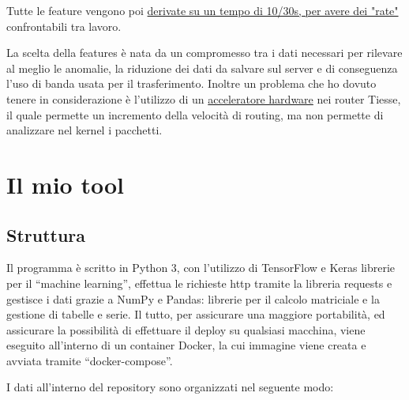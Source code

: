 Tutte le feature vengono poi \underline{derivate su un tempo di 10/30s, per avere dei "rate"} confrontabili tra lavoro.

La scelta della features è nata da un compromesso tra i dati necessari per rilevare al meglio le anomalie, la riduzione dei dati da salvare sul server e di conseguenza l'uso di banda usata per il trasferimento. Inoltre un problema che ho dovuto tenere in considerazione è l'utilizzo di un \underline{acceleratore hardware} nei router Tiesse, il quale permette un incremento della velocità di routing, ma non permette di analizzare nel kernel i pacchetti.
 
\section{Il mio tool}



\subsection{Struttura}

Il programma è scritto in Python 3, con l'utilizzo di TensorFlow e Keras librerie per il ``machine learning'', effettua le richieste http tramite la libreria requests e gestisce i dati grazie a NumPy e Pandas: librerie per il calcolo matriciale e la gestione di tabelle e serie.
Il tutto, per assicurare una maggiore portabilità, ed assicurare la possibilità di effettuare il deploy su qualsiasi macchina, viene eseguito all'interno di un container Docker, la cui immagine viene creata e avviata tramite ``docker-compose''.


I dati all'interno del repository sono organizzati nel seguente modo:

